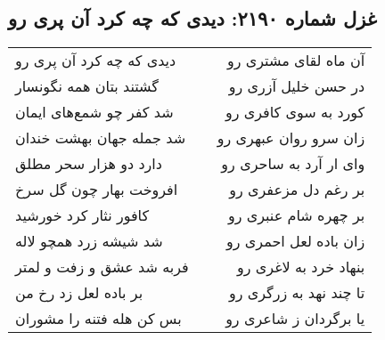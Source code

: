 \begin{center}
\section*{غزل شماره ۲۱۹۰: دیدی که چه کرد آن پری رو}
\label{sec:2190}
\begin{longtable}{l p{0.5cm} r}
دیدی که چه کرد آن پری رو
&&
آن ماه لقای مشتری رو
\\
گشتند بتان همه نگونسار
&&
در حسن خلیل آزری رو
\\
شد کفر چو شمع‌های ایمان
&&
کورد به سوی کافری رو
\\
شد جمله جهان بهشت خندان
&&
زان سرو روان عبهری رو
\\
دارد دو هزار سحر مطلق
&&
وای ار آرد به ساحری رو
\\
افروخت بهار چون گل سرخ
&&
بر رغم دل مزعفری رو
\\
کافور نثار کرد خورشید
&&
بر چهره شام عنبری رو
\\
شد شیشه زرد همچو لاله
&&
زان باده لعل احمری رو
\\
فربه شد عشق و زفت و لمتر
&&
بنهاد خرد به لاغری رو
\\
بر باده لعل زد رخ من
&&
تا چند نهد به زرگری رو
\\
بس کن هله فتنه را مشوران
&&
یا برگردان ز شاعری رو
\\
\end{longtable}
\end{center}
